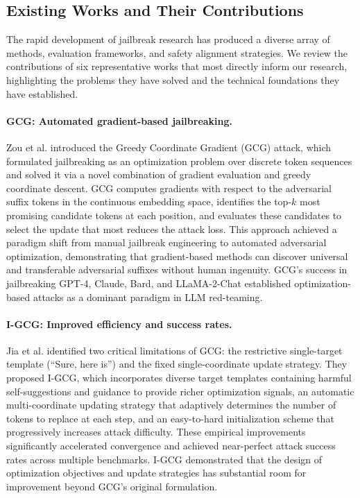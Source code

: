 \documentclass[preprint,12pt]{elsarticle}
\begin{document}
\subsection{Existing Works and Their Contributions}
\label{sec:existing_works}

The rapid development of jailbreak research has produced a diverse array of methods, evaluation frameworks, and safety alignment strategies. We review the contributions of six representative works that most directly inform our research, highlighting the problems they have solved and the technical foundations they have established.

\paragraph{GCG: Automated gradient-based jailbreaking.} Zou et al. \cite{zou2023universal} introduced the Greedy Coordinate Gradient (GCG) attack, which formulated jailbreaking as an optimization problem over discrete token sequences and solved it via a novel combination of gradient evaluation and greedy coordinate descent. GCG computes gradients with respect to the adversarial suffix tokens in the continuous embedding space, identifies the top-$k$ most promising candidate tokens at each position, and evaluates these candidates to select the update that most reduces the attack loss. This approach achieved a paradigm shift from manual jailbreak engineering to automated adversarial optimization, demonstrating that gradient-based methods can discover universal and transferable adversarial suffixes without human ingenuity. GCG's success in jailbreaking GPT-4, Claude, Bard, and LLaMA-2-Chat established optimization-based attacks as a dominant paradigm in LLM red-teaming.

\paragraph{I-GCG: Improved efficiency and success rates.} Jia et al. \cite{jia2024improved} identified two critical limitations of GCG: the restrictive single-target template (``Sure, here is'') and the fixed single-coordinate update strategy. They proposed I-GCG, which incorporates diverse target templates containing harmful self-suggestions and guidance to provide richer optimization signals, an automatic multi-coordinate updating strategy that adaptively determines the number of tokens to replace at each step, and an easy-to-hard initialization scheme that progressively increases attack difficulty. These empirical improvements significantly accelerated convergence and achieved near-perfect attack success rates across multiple benchmarks. I-GCG demonstrated that the design of optimization objectives and update strategies has substantial room for improvement beyond GCG's original formulation.
\end{document}
